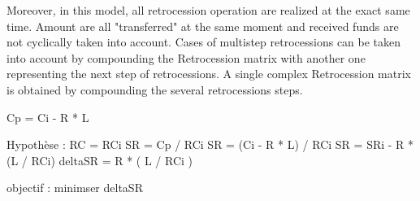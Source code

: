 Moreover, in this model, all retrocession operation are realized at the exact same time. Amount are all "transferred" at the same moment and received funds are not cyclically taken into account. Cases of multistep retrocessions can be taken into account by compounding the Retrocession matrix with another one representing the next step of retrocessions. A single complex Retrocession matrix is obtained by compounding the several retrocessions steps.




Cp = Ci - R * L


Hypothèse : RC = RCi
SR = Cp / RCi
SR =  (Ci - R * L) / RCi
SR = SRi - R * (L / RCi)
deltaSR = R * ( L / RCi )

objectif : minimser deltaSR
